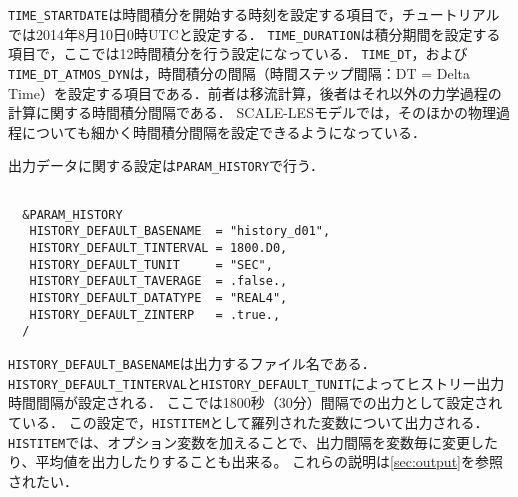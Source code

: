 \verb|TIME_STARTDATE|は時間積分を開始する時刻を設定する項目で，チュートリアルでは2014年8月10日0時UTCと設定する．
\verb|TIME_DURATION|は積分期間を設定する項目で，ここでは12時間積分を行う設定になっている．
\verb|TIME_DT|，および\verb|TIME_DT_ATMOS_DYN|は，時間積分の間隔（時間ステップ間隔：DT = Delta Time）を設定する項目である．前者は移流計算，後者はそれ以外の力学過程の計算に関する時間積分間隔である．
SCALE-LESモデルでは，そのほかの物理過程についても細かく時間積分間隔を設定できるようになっている．


出力データに関する設定は\verb|PARAM_HISTORY|で行う．

\begin{verbatim}

  &PARAM_HISTORY
   HISTORY_DEFAULT_BASENAME  = "history_d01",
   HISTORY_DEFAULT_TINTERVAL = 1800.D0,
   HISTORY_DEFAULT_TUNIT     = "SEC",
   HISTORY_DEFAULT_TAVERAGE  = .false.,
   HISTORY_DEFAULT_DATATYPE  = "REAL4",
   HISTORY_DEFAULT_ZINTERP   = .true.,
  /

\end{verbatim}
\verb|HISTORY_DEFAULT_BASENAME|は出力するファイル名である．
\verb|HISTORY_DEFAULT_TINTERVAL|と\verb|HISTORY_DEFAULT_TUNIT|によってヒストリー出力時間間隔が設定される．
ここでは1800秒（30分）間隔での出力として設定されている．
この設定で，\verb|HISTITEM|として羅列された変数について出力される．
\verb|HISTITEM|では、オプション変数を加えることで、出力間隔を変数毎に変更したり、平均値を出力したりすることも出来る。
これらの説明は\ref{sec:output}を参照されたい．

